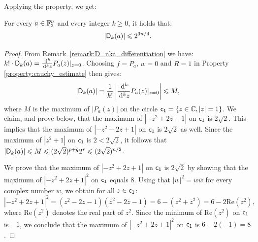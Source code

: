 \documentclass[11pt]{llncs}
\begin{document}




Applying the property, we get:

\begin{theorem}\label{theorem:bound_D_nka}
    For every $a\in\F_2^n$ and every integer $k\geq 0$, it holds that:
    \[
        |\Dnka nka|\leq 2^{3n/4}.
    \]
\end{theorem}

\begin{proof}
    From Remark~\ref{remark:D_nka_differentiation} we have: $k!\cdot\Dnka nka=\frac{\dd^k}{\dd^k z}P_a(z)\vert_{z=0}$. Choosing $f=P_a$, $w=0$ and $R=1$ in Property \ref{property:cauchy_estimate} then gives:
    \[
        |\Dnka nka|=\frac{1}{k!}\left|\frac{\dd^k}{\dd^k z}P_a(z)\vert_{z=0}\right|\leq M,
    \]
    where $M$ is the maximum of $|P_a(z)|$ on the circle %
    $\dis=\{ z \in \C,  |z|=1  \}$.
    We claim, and prove below, that the maximum of $\left|-z^2+2z+1\right|$ on $\dis$ is $2\sqrt 2$. 
    This implies that the maximum of $\left|-z^2-2z+1\right|$ on $\dis$ is $2\sqrt 2$ as well. 
    Since the maximum of $\left|z^2+1\right|$ on $\dis$ is $2<2\sqrt 2$, it follows that $|\Dnka nka|\leq M\leq (2\sqrt 2)^{p+q}2^r\leq (2\sqrt 2)^{n/2}$.

	We prove that the maximum of $\left|-z^2+2z+1\right|$ on $\dis$ is $2\sqrt 2$ by showing that the maximum of $\left|-z^2+2z+1\right|^2$ on $\dis$ equals $8$.
    Using that $|w|^2=w\overline w$ for every complex number $w$, we obtain for all $z\in \dis$:
    \[
        \left|-z^2+2z+1\right|^2=\left(z^2-2z-1\right)\left(\overline z^2-2\overline z-1\right)=6-\left(z^2+\overline z^2\right)=6-2\mathrm{Re}\left(z^2\right),
    \]
    where $\mathrm{Re}\left(z^2\right)$ denotes the real part of $z^2$. Since the minimum of $\mathrm{Re}\left(z^2\right)$ on $\dis$ is $-1$, we conclude that the maximum of $\left|-z^2+2z+1\right|^2$ on $\dis$ is $6-2(-1)=8$.
\end{proof}
\end{document}
